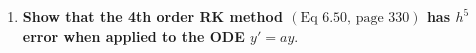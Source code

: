 \documentclass[11pt]{article}
\theoremstyle{definition}
\begin{document}
\begin{enumerate}

    \newpage

    \item \textbf{Show that the 4th order RK method $(\text{Eq } 6.50, \, \text{page } 330)$ has $h^5$ error when applied to the ODE $y'=ay.$}
\end{enumerate}
\end{document}
